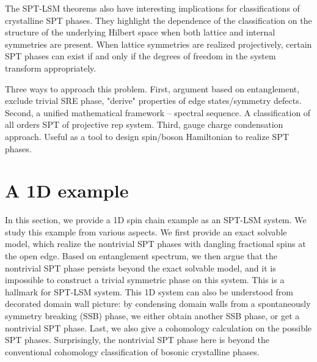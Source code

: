 \documentclass[reprint,amsmath,amssymb,aps,pra,]{revtex4-1}
\begin{document}
The SPT-LSM theorems also have interesting implications for classifications of crystalline SPT phases. They highlight the dependence of the classification on the structure of the underlying Hilbert space when both lattice and internal symmetries are present. When lattice symmetries are realized projectively, certain SPT phases can exist if and only if the degrees of freedom in the system transform appropriately. 




Three ways to approach this problem.
First, argument based on entanglement, exclude trivial SRE phase, "derive" properties of edge states/symmetry defects.
Second, a unified mathematical framework -- spectral sequence. A classification of all orders SPT of projective rep system.
Third, gauge charge condensation approach. Useful as a tool to design spin/boson Hamiltonian to realize SPT phases.


\section{A 1D example}
In this section, we provide a 1D spin chain example as an SPT-LSM system.
We study this example from various aspects.
We first provide an exact solvable model, which realize the nontrivial SPT phases with dangling fractional spins at the open edge.
Based on entanglement spectrum, we then argue that the nontrivial SPT phase persists beyond the exact solvable model, and it is impossible to construct a trivial symmetric phase on this system.
This is a hallmark for SPT-LSM system.
This 1D system can also be understood from decorated domain wall picture: by condensing domain walls from a spontaneously symmetry breaking (SSB) phase, we either obtain another SSB phase, or get a nontrivial SPT phase.
Last, we also give a cohomology calculation on the possible SPT phases.
Surprisingly, the nontrivial SPT phase here is beyond the conventional cohomology classification of bosonic crystalline phases.
\end{document}
